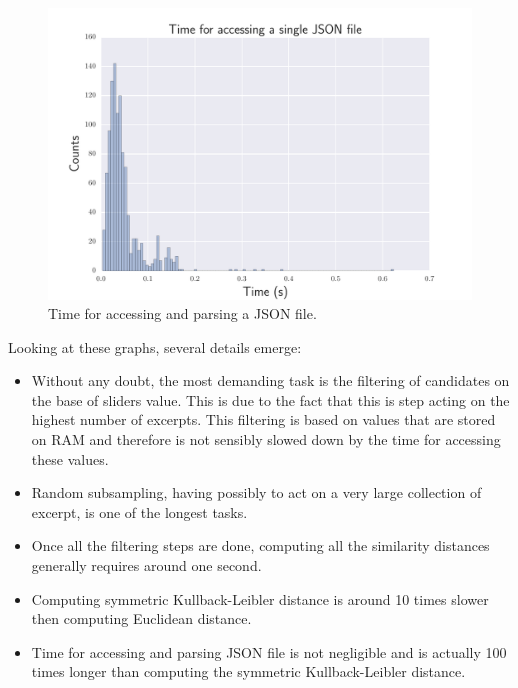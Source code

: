 \begin{figure}[htbp]
\begin{center}
\includegraphics[scale=0.7]{Figures/bench_json_single.pdf}
  \caption[Time for accessing and parsing a JSON file]{Time for accessing and parsing a JSON file.}
  \label{fig:step8}
\end{center}
\end{figure}

Looking at these graphs, several details emerge:
\begin{itemize}
\item Without any doubt, the most demanding task is the filtering of candidates on the base of sliders value. This is due to the fact that this is step acting on the highest number of excerpts. This filtering is based on values that are stored on RAM and therefore is not sensibly slowed down by the time for accessing these values. 
\item Random subsampling, having possibly to act on a very large collection of excerpt, is one of the longest tasks.
\item Once all the filtering steps are done, computing all the similarity distances generally requires around one second. 
\item Computing symmetric Kullback-Leibler distance is around 10 times slower then computing Euclidean distance.
\item Time for accessing and parsing JSON file is not negligible and is actually 100 times longer than computing the symmetric Kullback-Leibler distance.
\end{itemize}

